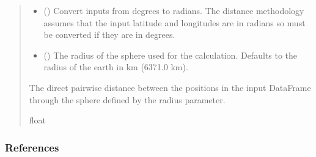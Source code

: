 \documentclass[letterpaper,10pt,english]{sphinxmanual}
\begin{document}
\begin{fulllineitems}
\begin{quote}
\begin{description}
\begin{itemize}
\item {}
\sphinxAtStartPar
{} () \textendash{} Convert inputs from degrees to radians. The distance methodology assumes
that the input latitude and longitudes are in radians so must be
converted if they are in degrees.

\item {}
\sphinxAtStartPar
{} () \textendash{} The radius of the sphere used for the calculation. Defaults to the
radius of the earth in km (6371.0 km).

\end{itemize}

\sphinxAtStartPar
{} \textendash{} The direct pairwise distance between the positions in the input
DataFrame through the sphere defined by the radius parameter.

\sphinxAtStartPar
float

\end{description}\end{quote}
\subsubsection*{References}

\sphinxAtStartPar
{}

\end{fulllineitems}

\end{document}
